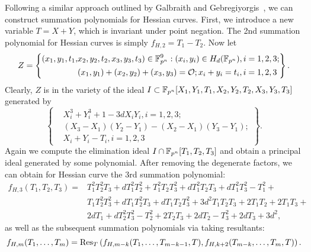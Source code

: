 Following a similar approach outlined by Galbraith and
Gebregiyorgis~\cite{DBLP:conf/indocrypt/GalbraithG14}, we can
construct summation polynomials for Hessian curves.
%
First, we introduce a new variable $T=X+Y$, which is invariant under
point negation.
%
The 2nd summation polynomial for Hessian curves is simply
$f_{H,2} = T_1 - T_2$.
%
Now let
\[ Z=\left\{\begin{aligned}
      (x_1,y_1,t_1,&x_2,y_2,t_2,x_3,y_3,t_3)\in\mathbb F_{p^n}^9:(x_i,y_i)\in H_d(\mathbb F_{p^n}),i=1,2,3; \\
      & (x_1,y_1)+(x_2,y_2)+(x_3,y_3)=\mathcal O; x_i+y_i=t_i,i=1,2,3
    \end{aligned} \right\}. \]
%
Clearly, $Z$ is in the variety of the ideal
$I\subset\mathbb F_{p^n}[X_1,Y_1,T_1,X_2,Y_2,T_2,X_3,Y_3,T_3]$ generated by
\[ \left\{\begin{aligned}
      & X_i^3 + Y_i^3 + 1 - 3dX_iY_i,i=1,2,3; \\
      &  (X_3 - X_1)(Y_2 - Y_1) - (X_2 - X_1)(Y_3 - Y_1); \\
      & X_i + Y_i - T_i,i=1,2,3
    \end{aligned}\right\}. \]
%
Again we compute the elimination ideal $I\cap\mathbb F_{p^n}[T_1,T_2,T_3]$ and
obtain a principal ideal generated by some polynomial.
%
After removing the degenerate factors, we can obtain for Hessian curve
the 3rd summation polynomial:
\begin{align*}
  f_{H,3}(T_1,T_2,T_3) = & T_1^2T_2^2T_3 + dT_1^2T_2^2 + T_1^2T_2T_3^2
                           + dT_1^2T_2T_3 + dT_1^2T_3^2 - T_1^2 + \\
                         & T_1T_2^2T_3^2 + dT_1T_2^2T_3 + dT_1T_2T_3^2
                           + 3d^2T_1T_2T_3 + 2T_1T_2 + 2T_1T_3 + \\
                         & 2dT_1 + dT_2^2T_3^2 - T_2^2 + 2T_2T_3 +
                           2dT_2 - T_3^2 + 2dT_3 + 3d^2,
\end{align*}
%
as well as the subsequent summation polynomials via taking resultants:
\[ f_{H,m}(T_1,\ldots,T_m) =
  \operatorname{Res}_T\left(f_{H,m-k}(T_1,\ldots,T_{m-k-1},T),f_{H,k+2}(T_{m-k},\ldots,T_m,T)\right). \]



